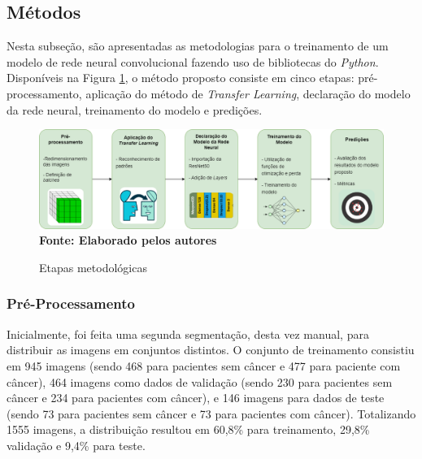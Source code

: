 \subsection{\esp Métodos} \label{metodos}

Nesta subseção, são apresentadas as metodologias para o treinamento de um modelo de rede neural convolucional fazendo uso de bibliotecas do \textit{Python}. Disponíveis na Figura \ref{fig:diagrama}, o método proposto consiste em cinco etapas: pré-processamento, aplicação do método de \textit{Transfer Learning}, declaração do modelo da rede neural, treinamento do modelo e predições.

\begin{figure}[ht]
 	\centering	
 	\caption[\hspace{0.1cm}Grade Computacional.]{Etapas metodológicas}
 	\vspace{-0.2cm}
 	\includegraphics[width=1\textwidth]{figuras/tcc_diagrama.drawio.png}
    \captionsetup{justification=centering}
  \vspace{-0.2cm}
     \\\textbf{\footnotesize Fonte: Elaborado pelos autores}
	\label{fig:diagrama}
\end{figure}




\subsubsection{\esp Pré-Processamento} \label{preprocess}

Inicialmente, foi feita uma segunda segmentação, desta vez manual, para distribuir as imagens em conjuntos distintos. O conjunto de treinamento consistiu em 945 imagens (sendo 468 para pacientes sem câncer e 477 para paciente com câncer), 464 imagens como dados de validação (sendo 230 para pacientes sem câncer e 234 para pacientes com câncer), e 146 imagens para dados de teste (sendo 73 para pacientes sem câncer e 73 para pacientes com câncer). Totalizando 1555 imagens, a distribuição resultou em 60,8\% para treinamento, 29,8\% validação e 9,4\% para teste.

